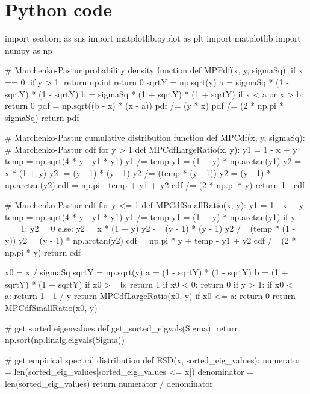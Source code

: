 \documentclass[a4paper,11pt]{book}
\theoremstyle{plain}
\theoremstyle{definition}
\begin{document}
    	\chapter{Python code}
    	\begin{python}
import seaborn as sns
import matplotlib.pyplot as plt
import matplotlib
import numpy as np  
  		
    		
# Marchenko-Pastur probability density function
def MPPdf(x, y, sigmaSq):
    if x == 0:
        if y > 1:
            return np.inf
        return 0
    sqrtY = np.sqrt(y)
    a = sigmaSq * (1 - sqrtY) * (1 - sqrtY)
    b = sigmaSq * (1 + sqrtY) * (1 + sqrtY)
    if x < a or x > b:
        return 0
    pdf = np.sqrt((b - x) * (x - a))
    pdf /= (y * x)
    pdf /= (2 * np.pi * sigmaSq)
    return pdf


# Marchenko-Pastur cumulative distribution function
def MPCdf(x, y, sigmaSq):
    # Marchenko-Pastur cdf for y > 1
    def MPCdfLargeRatio(x, y):
        y1 = 1 - x + y
        temp = np.sqrt(4 * y - y1 * y1)
        y1 /= temp
        y1 = (1 + y) * np.arctan(y1)
        y2 = x * (1 + y)
        y2 -= (y - 1) * (y - 1)
        y2 /= (temp * (y - 1))
        y2 = (y - 1) * np.arctan(y2)
        cdf = np.pi - temp + y1 + y2
        cdf /= (2 * np.pi * y)
        return 1 - cdf

    # Marchenko-Pastur cdf for y <= 1
    def MPCdfSmallRatio(x, y):
        y1 = 1 - x + y
        temp = np.sqrt(4 * y - y1 * y1)
        y1 /= temp
        y1 = (1 + y) * np.arctan(y1)
        if y == 1:
            y2 = 0
        else:
            y2 = x * (1 + y)
            y2 -= (y - 1) * (y - 1)
            y2 /= (temp * (1 - y))
            y2 = (y - 1) * np.arctan(y2)
        cdf = np.pi * y + temp - y1 + y2
        cdf /= (2 * np.pi * y)
        return cdf

    x0 = x / sigmaSq
    sqrtY = np.sqrt(y)
    a = (1 - sqrtY) * (1 - sqrtY)
    b = (1 + sqrtY) * (1 + sqrtY)
    if x0 >= b:
        return 1
    if x0 < 0:
        return 0
    if y > 1:
        if x0 <= a:
            return 1 - 1 / y
        return MPCdfLargeRatio(x0, y)
    if x0 <= a:
        return 0
    return MPCdfSmallRatio(x0, y)


# get sorted eigenvalues
def get_sorted_eigvals(Sigma):
    return np.sort(np.linalg.eigvals(Sigma))


# get empirical spectral distribution
def ESD(x, sorted_eig_values):
    numerator = len(sorted_eig_values[sorted_eig_values <= x])
    denominator = len(sorted_eig_values)
    return numerator / denominator



\end{python}
\end{document}
